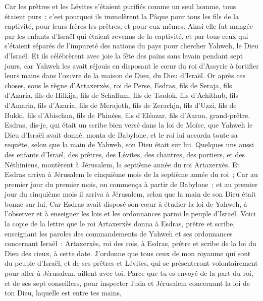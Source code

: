 \begin{multicols}{2}
Car les prêtres et les Lévites s'étaient purifiés comme un seul homme, tous étaient purs~; c'est pourquoi ils immolèrent la Pâque pour tous les fils de la captivité, pour leurs frères les prêtres, et pour eux-mêmes.
Ainsi elle fut mangée par les enfants d'Israël qui étaient revenus de la captivité, et par tous ceux qui s'étaient séparés de l'impureté des nations du pays pour chercher Yahweh, le Dieu d'Israël.
Et ils célébrèrent avec joie la fête des pains sans levain pendant sept jours, car Yahweh les avait réjouis en disposant le cœur du roi d'Assyrie à fortifier leurs mains dans l'œuvre de la maison de Dieu, du Dieu d'Israël.
\VerseOne{}Or après ces choses, sous le règne d'Artaxerxès, roi de Perse, Esdras, fils de Seraja, fils d'Azaria, fils de Hilkija,
fils de Schallum, fils de Tsadok, fils d'Achithub,
fils d'Amaria, fils d'Azaria, fils de Merajoth,
fils de Zerachja, fils d'Uzzi, fils de Bukki,
fils d'Abischua, fils de Phinées, fils d'Eléazar, fils d'Aaron, grand-prêtre.
Esdras, dis-je, qui était un scribe bien versé dans la loi de Moïse, que Yahweh le Dieu d'Israël avait donné, monta de Babylone, et le roi lui accorda toute sa requête, selon que la main de Yahweh, son Dieu était sur lui.
Quelques uns aussi des enfants d'Israël, des prêtres, des Lévites, des chantres, des portiers, et des Néthiniens, montèrent à Jérusalem, la septième année du roi Artaxerxès.
Et Esdras arriva à Jérusalem le cinquième mois de la septième année du roi~;
Car au premier jour du premier mois, on commença à partir de Babylone~; et au premier jour du cinquième mois il arriva à Jérusalem, selon que la main de son Dieu était bonne sur lui.
Car Esdras avait disposé son cœur à étudier la loi de Yahweh, à l'observer et à enseigner les lois et les ordonnances parmi le peuple d'Israël.
Voici la copie de la lettre que le roi Artaxerxès donna à Esdras, prêtre et scribe, enseignant les paroles des commandements de Yahweh et ses ordonnances concernant Israël~:
Artaxerxès, roi des rois, à Esdras, prêtre et scribe de la loi du Dieu des cieux, à cette date.
J'ordonne que tous ceux de mon royaume qui sont du peuple d'Israël, et de ses prêtres et Lévites, qui se présenteront volontairement pour aller à Jérusalem, aillent avec toi.
Parce que tu es envoyé de la part du roi, et de ses sept conseillers, pour inspecter Juda et Jérusalem concernant la loi de ton Dieu, laquelle est entre tes mains,

\end{multicols}
